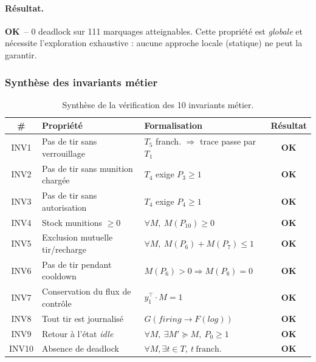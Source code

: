 \documentclass[11pt,a4paper]{article}
\newcommand{\OK}{\textcolor{green!50!black}{\textbf{OK}}}
\begin{document}
\paragraph{Résultat.}
\OK\ -- 0 deadlock sur 111 marquages atteignables. Cette propriété est
\emph{globale} et nécessite l'exploration exhaustive : aucune approche
locale (statique) ne peut la garantir.

\subsubsection*{Synthèse des invariants métier}

\begin{table}[H]
\centering\small
\begin{tabularx}{\linewidth}{c X l c}
\toprule
\rowcolor{tableheader}\textbf{\#} & \textbf{Propriété} & \textbf{Formalisation} & \textbf{Résultat} \\
\midrule
INV1  & Pas de tir sans verrouillage      & $T_5$ franch. $\Rightarrow$ trace passe par $T_1$ & \OK \\
INV2  & Pas de tir sans munition chargée  & $T_4$ exige $P_3 \geq 1$                          & \OK \\
INV3  & Pas de tir sans autorisation      & $T_4$ exige $P_4 \geq 1$                          & \OK \\
INV4  & Stock munitions $\geq 0$          & $\forall M,\ M(P_{10}) \geq 0$                    & \OK \\
INV5  & Exclusion mutuelle tir/recharge   & $\forall M,\ M(P_6) + M(P_7) \leq 1$              & \OK \\
INV6  & Pas de tir pendant cooldown       & $M(P_6) > 0 \Rightarrow M(P_8) = 0$               & \OK \\
INV7  & Conservation du flux de contrôle  & $y_1^\top \cdot M = 1$                            & \OK \\
INV8  & Tout tir est journalisé           & $G(\textit{firing} \rightarrow F(\textit{log}))$  & \OK \\
INV9  & Retour à l'état \textit{idle}     & $\forall M,\ \exists M' \succeq M,\ P_0 \geq 1$   & \OK \\
INV10 & Absence de deadlock               & $\forall M, \exists t \in T,\ t\ \text{franch.}$  & \OK \\
\bottomrule
\end{tabularx}
\caption{Synthèse de la vérification des 10 invariants métier.}
\end{table}
\end{document}
